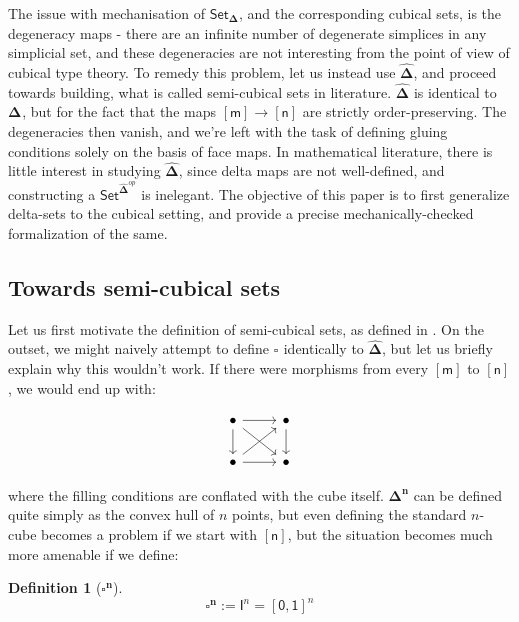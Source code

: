\documentclass[10pt, titlepage]{amsart}
\newtheorem{definition}{Definition}
\newcommand{\Set}{\ensuremath{\mathsf{Set}}}
\newcommand{\Simplex}[1]{\ensuremath{\boldsymbol{\Delta^{#1}}}}
\newcommand{\DeltaHat}{\ensuremath{\hat{\boldsymbol{\Delta}}}}
\newcommand{\SSet}{\ensuremath{\mathsf{Set}_{\boldsymbol{\Delta}}}}
\newcommand{\sq}[1]{\ensuremath{\mathsf{[#1]}}}
\newcommand{\Cube}[1]{\ensuremath{\boldsymbol{\square^{#1}}}}
\newcommand{\I}[1]{\ensuremath{\mathsf{I}^{#1}}}
\begin{document}
The issue with mechanisation of \SSet, and the corresponding cubical sets, is the degeneracy maps - there are an infinite number of degenerate simplices in any simplicial set, and these degeneracies are not interesting from the point of view of cubical type theory. To remedy this problem, let us instead use \DeltaHat, and proceed towards building, what is called semi-cubical sets in literature. $\DeltaHat$ is identical to \Simplex{}, but for the fact that the maps $\sq{m} \rightarrow \sq{n}$ are strictly order-preserving. The degeneracies then vanish, and we're left with the task of defining gluing conditions solely on the basis of face maps. In mathematical literature, there is little interest in studying \DeltaHat, since delta maps are not well-defined, and constructing a $\Set^{\DeltaHat^{op}}$ is inelegant. The objective of this paper is to first generalize delta-sets to the cubical setting, and provide a precise mechanically-checked formalization of the same.

\subsection{Towards semi-cubical sets}

Let us first motivate the definition of semi-cubical sets, as defined in \cite{Antolini00}. On the outset, we might naively attempt to define $\Cube{}$ identically to \DeltaHat, but let us briefly explain why this wouldn't work. If there were morphisms from every $\sq{m}$ to $\sq{n}$, we would end up with:

$$
  \begin{tikzcd}
    \bullet \arrow[r] \arrow[dr] \arrow[d] & \bullet \arrow[d] \\
    \bullet \arrow[r] \arrow[ur] & \bullet
  \end{tikzcd}
$$

where the filling conditions are conflated with the cube itself. $\Simplex{n}$ can be defined quite simply as the convex hull of $n$ points, but even defining the standard $n$-cube becomes a problem if we start with $\sq{n}$, but the situation becomes much more amenable if we define:

\begin{definition}[\Cube{n}]
  \begin{equation*}
    \Cube{n} := \I{n} = \sq{0, 1}^n
  \end{equation*}
\end{definition}
\end{document}
